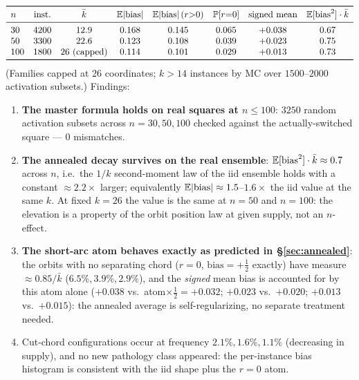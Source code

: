 \[
\begin{array}{lccccccc}
\toprule
n & \text{inst.} & \bar k & \E|\mathrm{bias}| &
\E|\mathrm{bias}|\,(r{>}0) & \Pr[r{=}0] & \text{signed mean} &
\E[\mathrm{bias}^2]\cdot\bar k\\
\midrule
30  & 4200 & 12.9 & 0.168 & 0.145 & 0.065 & +0.038 & 0.67\\
50  & 3300 & 22.6 & 0.123 & 0.108 & 0.039 & +0.023 & 0.75\\
100 & 1800 & 26\ (\text{capped}) & 0.114 & 0.101 & 0.029 & +0.013
& 0.73\\
\bottomrule
\end{array}
\]
(Families capped at $26$ coordinates; $k>14$ instances by MC over
$1500$--$2000$ activation subsets.)  Findings:
\begin{enumerate}[leftmargin=2em]
\item \textbf{The master formula holds on real squares at
$n\le100$}: $3250$ random activation subsets across $n=30,50,100$
checked against the actually-switched square --- $0$ mismatches.
\item \textbf{The annealed decay survives on the real ensemble}:
$\mathbb{E}[\mathrm{bias}^2]\cdot\bar k\approx0.7$ across $n$, i.e.\ the
$1/k$ second-moment law of the iid ensemble holds with a constant
$\approx2.2\times$ larger; equivalently
$\mathbb{E}|\mathrm{bias}|\approx1.5$--$1.6\times$ the iid value at the same
$k$.  At fixed $k=26$ the value is the same at $n=50$ and $n=100$:
the elevation is a property of the orbit position law at given
supply, not an $n$-effect.
\item \textbf{The short-arc atom behaves exactly as predicted in
\S\ref{sec:annealed}}: the orbits with no separating chord ($r=0$,
$\mathrm{bias}=+\tfrac12$ exactly) have measure $\approx0.85/\bar k$
($6.5\%,3.9\%,2.9\%$), and the \emph{signed} mean bias is accounted
for by this atom alone ($+0.038$ vs.\ atom$\times\tfrac12=+0.032$;
$+0.023$ vs.\ $+0.020$; $+0.013$ vs.\ $+0.015$): the annealed
average is self-regularizing, no separate treatment needed.
\item Cut-chord configurations occur at frequency
$2.1\%,1.6\%,1.1\%$ (decreasing in supply), and no new pathology
class appeared: the per-instance bias histogram is consistent with
the iid shape plus the $r=0$ atom.
\end{enumerate}

